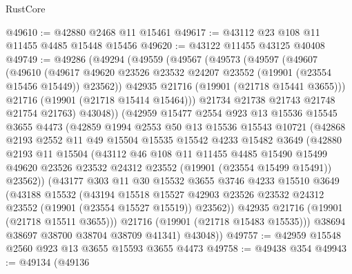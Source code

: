 \begin{lexlean}{RustCore}
\begin{coremodule}
@49610 := @42880 @2468 @11 @15461
@49617 := @43112 @23 @108 @11 @11455 @4485 @15448 @15456
@49620 := @43122 @11455 @43125 @40408
@49749 := @49286
    (@49294
      (@49559
        (@49567
          (@49573
            (@49597
              (@49607
                (@49610
                  (@49617
                    @49620
                    @23526
                    @23532
                    @24207
                    @23552
                    (@19901 (@23554 @15456 @15449))
                    @23562))
                @42935
                @21716
                (@19901 (@21718 @15441 @3655)))
              @21716
              (@19901 (@21718 @15414 @15464)))
            @21734
            @21738
            @21743
            @21748
            @21754
            @21763)
          @43048))
      (@42959
        @15477
        @2554
        @923
        @13
        @15536
        @15545
        @3655
        @4473
        (@42859
          @1994
          @2553
          @50
          @13
          @15536
          @15543
          @10721
          (@42868
            @2193
            @2552
            @11
            @49
            @15504
            @15535
            @15542
            @4233
            @15482
            @3649
            (@42880
              @2193
              @11
              @15504
              (@43112
                @46
                @108
                @11
                @11455
                @4485
                @15490
                @15499
                @49620
                @23526
                @23532
                @24312
                @23552
                (@19901 (@23554 @15499 @15491))
                @23562))
            (@43177
              @303
              @11
              @30
              @15532
              @3655
              @3746
              @4233
              @15510
              @3649
              (@43188
                @15532
                (@43194
                  @15518
                  @15527
                  @42903
                  @23526
                  @23532
                  @24312
                  @23552
                  (@19901 (@23554 @15527 @15519))
                  @23562))
              @42935
              @21716
              (@19901 (@21718 @15511 @3655)))
            @21716
            (@19901 (@21718 @15483 @15535)))
          @38694
          @38697
          @38700
          @38704
          @38709
          @41341)
        @43048))
@49757 := @42959 @15548 @2560 @923 @13 @3655 @15593 @3655 @4473
@49758 := @49438 @354
@49943 := @49134
    (@49136

\end{coremodule}
\end{lexlean}
